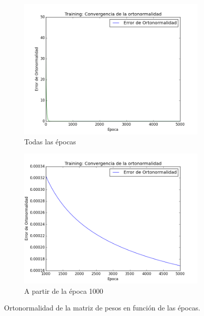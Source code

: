 \begin{figure}[H]
        \begin{subfigure}[b]{0.5\textwidth}
                \includegraphics[width=\linewidth]{secciones/graficos/sanger/error.png}
                \caption{Todas las épocas}
                \label{fig: ej1_sanger_error}
        \end{subfigure}
        \begin{subfigure}[b]{0.5\textwidth}
                \includegraphics[width=\linewidth]{secciones/graficos/sanger/error_zoom.png}
                \caption{A partir de la época 1000}
                \label{fig: ej1_sanger_error_zoom}
        \end{subfigure}
        \caption{Ortonormalidad de la matriz de pesos en función de las épocas.}
        \label{fig: ej1_sanger_errores}
\end{figure}

